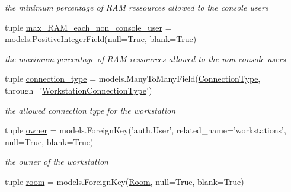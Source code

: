 \begin{DoxyCompactItemize}
\begin{DoxyCompactList}\small\item\em the minimum percentage of R\+A\+M ressources allowed to the console users \end{DoxyCompactList}\item 
\hypertarget{classrestriction__system_1_1models_1_1Workstation_a0e1c82212d212107e0126d962853a7bf}{}tuple \hyperlink{classrestriction__system_1_1models_1_1Workstation_a0e1c82212d212107e0126d962853a7bf}{max\+\_\+\+R\+A\+M\+\_\+each\+\_\+non\+\_\+console\+\_\+user} = models.\+Positive\+Integer\+Field(null=True, blank=True)\label{classrestriction__system_1_1models_1_1Workstation_a0e1c82212d212107e0126d962853a7bf}

\begin{DoxyCompactList}\small\item\em the maximum percentage of R\+A\+M ressources allowed to the non console users \end{DoxyCompactList}\item 
\hypertarget{classrestriction__system_1_1models_1_1Workstation_a74cd3332b7903ebe286c5f5104f723fc}{}tuple \hyperlink{classrestriction__system_1_1models_1_1Workstation_a74cd3332b7903ebe286c5f5104f723fc}{connection\+\_\+type} = models.\+Many\+To\+Many\+Field(\hyperlink{classrestriction__system_1_1models_1_1ConnectionType}{Connection\+Type}, through='\hyperlink{classrestriction__system_1_1models_1_1WorkstationConnectionType}{Workstation\+Connection\+Type}')\label{classrestriction__system_1_1models_1_1Workstation_a74cd3332b7903ebe286c5f5104f723fc}

\begin{DoxyCompactList}\small\item\em the allowed connection type for the workstation \end{DoxyCompactList}\item 
\hypertarget{classrestriction__system_1_1models_1_1Workstation_a951ab2ecfbbac6c2053cdf45d659fabc}{}tuple \hyperlink{classrestriction__system_1_1models_1_1Workstation_a951ab2ecfbbac6c2053cdf45d659fabc}{owner} = models.\+Foreign\+Key('auth.\+User', related\+\_\+name='workstations', null=True, blank=True)\label{classrestriction__system_1_1models_1_1Workstation_a951ab2ecfbbac6c2053cdf45d659fabc}

\begin{DoxyCompactList}\small\item\em the owner of the workstation \end{DoxyCompactList}\item 
\hypertarget{classrestriction__system_1_1models_1_1Workstation_a134aa235932ba254dfb15203cdba4cf5}{}tuple \hyperlink{classrestriction__system_1_1models_1_1Workstation_a134aa235932ba254dfb15203cdba4cf5}{room} = models.\+Foreign\+Key(\hyperlink{classrestriction__system_1_1models_1_1Room}{Room}, null=True, blank=True)\label{classrestriction__system_1_1models_1_1Workstation_a134aa235932ba254dfb15203cdba4cf5}


\end{DoxyCompactItemize}
